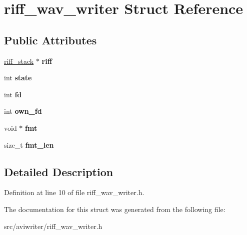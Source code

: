 \hypertarget{structriff__wav__writer}{\section{riff\-\_\-wav\-\_\-writer Struct Reference}
\label{structriff__wav__writer}
}
\subsection*{Public Attributes}
\begin{DoxyCompactItemize}
\item 
\hypertarget{structriff__wav__writer_a820068b8cd4942fbc99ed05303a8f08c}{\hyperlink{structriff__stack}{riff\-\_\-stack} $\ast$ {\bfseries riff}}\label{structriff__wav__writer_a820068b8cd4942fbc99ed05303a8f08c}

\item 
\hypertarget{structriff__wav__writer_a514674d25d32b68eccee91b83300bad3}{int {\bfseries state}}\label{structriff__wav__writer_a514674d25d32b68eccee91b83300bad3}

\item 
\hypertarget{structriff__wav__writer_a83bb301b9bdc426fd349e8e93475fd28}{int {\bfseries fd}}\label{structriff__wav__writer_a83bb301b9bdc426fd349e8e93475fd28}

\item 
\hypertarget{structriff__wav__writer_a6dbc633af04eaf3aee37fff12849d627}{int {\bfseries own\-\_\-fd}}\label{structriff__wav__writer_a6dbc633af04eaf3aee37fff12849d627}

\item 
\hypertarget{structriff__wav__writer_affde4eb7611f320ba31bd17cfed6dbda}{void $\ast$ {\bfseries fmt}}\label{structriff__wav__writer_affde4eb7611f320ba31bd17cfed6dbda}

\item 
\hypertarget{structriff__wav__writer_af2575e325102077b150f8998121fd074}{size\-\_\-t {\bfseries fmt\-\_\-len}}\label{structriff__wav__writer_af2575e325102077b150f8998121fd074}

\end{DoxyCompactItemize}


\subsection{Detailed Description}


Definition at line 10 of file riff\-\_\-wav\-\_\-writer.\-h.



The documentation for this struct was generated from the following file\-:\begin{DoxyCompactItemize}
\item 
src/aviwriter/riff\-\_\-wav\-\_\-writer.\-h\end{DoxyCompactItemize}

